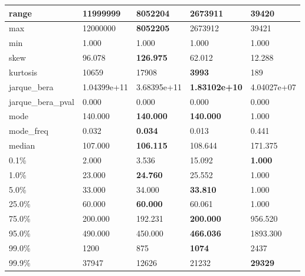 \begin{table}[H]
\begin{tabular}{|l|m{10em}|m{10em}|m{10em}|m{10em}|}
\hline range & 11999999 & \bfseries 8052204 & 2673911 & \cellcolor[rgb]{0.9, 0.54, 0.52} 39420 \\
\hline max & 12000000 & \bfseries 8052205 & 2673912 & \cellcolor[rgb]{0.9, 0.54, 0.52} 39421 \\
\hline min & 1.000 & 1.000 & 1.000 & 1.000 \\
\hline skew & 96.078 & \bfseries 126.975 & 62.012 & \cellcolor[rgb]{0.9, 0.54, 0.52} 12.288 \\
\hline kurtosis & 10659 & 17908 & \bfseries 3993 & \cellcolor[rgb]{0.9, 0.54, 0.52} 189 \\
\hline jarque\_bera & 1.04399e+11 & \cellcolor[rgb]{0.9, 0.54, 0.52} 3.68395e+11 & \bfseries 1.83102e+10 & 4.04027e+07 \\
\hline jarque\_bera\_pval & 0.000 & 0.000 & 0.000 & 0.000 \\
\hline mode & 140.000 & \bfseries 140.000 & \bfseries 140.000 & \cellcolor[rgb]{0.9, 0.54, 0.52} 1.000 \\
\hline mode\_freq & 0.032 & \bfseries 0.034 & 0.013 & \cellcolor[rgb]{0.9, 0.54, 0.52} 0.441 \\
\hline median & 107.000 & \bfseries 106.115 & 108.644 & \cellcolor[rgb]{0.9, 0.54, 0.52} 171.375 \\
\hline 0.1\% & 2.000 & 3.536 & \cellcolor[rgb]{0.9, 0.54, 0.52} 15.092 & \bfseries 1.000 \\
\hline 1.0\% & 23.000 & \bfseries 24.760 & 25.552 & \cellcolor[rgb]{0.9, 0.54, 0.52} 1.000 \\
\hline 5.0\% & 33.000 & 34.000 & \bfseries 33.810 & \cellcolor[rgb]{0.9, 0.54, 0.52} 1.000 \\
\hline 25.0\% & 60.000 & \bfseries 60.000 & 60.061 & \cellcolor[rgb]{0.9, 0.54, 0.52} 1.000 \\
\hline 75.0\% & 200.000 & 192.231 & \bfseries 200.000 & \cellcolor[rgb]{0.9, 0.54, 0.52} 956.520 \\
\hline 95.0\% & 490.000 & 450.000 & \bfseries 466.036 & \cellcolor[rgb]{0.9, 0.54, 0.52} 1893.300 \\
\hline 99.0\% & 1200 & 875 & \bfseries 1074 & \cellcolor[rgb]{0.9, 0.54, 0.52} 2437 \\
\hline 99.9\% & 37947 & \cellcolor[rgb]{0.9, 0.54, 0.52} 12626 & 21232 & \bfseries 29329 \\
\hline
\end{tabular}
\end{table}
